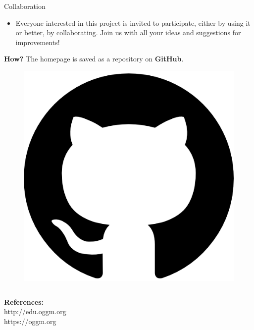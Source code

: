 \documentclass[final]{beamer}
\newcommand*{\smalllogo}[1]{%
	\raisebox{-.3\baselineskip}{%
		\texttt{[image: \#1]}%
	}%
}
\begin{document}
\begin{frame}[fragile]
\begin{columns}
\begin{rightcolumn}
	\begin{boxblock}{Collaboration}
		\begin{minipage}[t]{0.9\textwidth}
				\begin{itemize}	\item[\smalllogo{kopf.png}] Everyone interested in this project is invited to participate, either by using it or better, by collaborating. Join us with all your ideas and suggestions for improvements!
				\end{itemize}
				\textbf{How?} The homepage is saved as a repository on \textbf{GitHub}. 
		\end{minipage}
		\hfill
		\begin{minipage}[t]{0.02\textwidth}
				\begin{figure}
						\includegraphics[width=\textwidth]{github_logo}
				\end{figure}
		\end{minipage}
	\end{boxblock}
\end{rightcolumn}
\end{columns}

\begin{footnotesize}
	
	\vspace{0.3cm}
	\begin{minipage}[t]{0.75\textwidth}
		\textbf{References:} \\
		http://edu.oggm.org \\
		https://oggm.org
		\vspace{0.7cm}
		

\end{minipage}
\end{footnotesize}
\end{frame}
\end{document}
